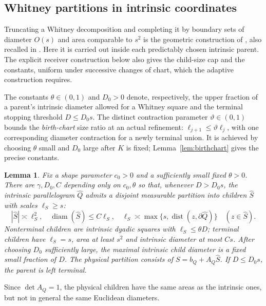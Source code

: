 \documentclass[11pt]{article}
\newtheorem{lemma}[lemma]{Lemma}
\theoremstyle{definition}
\theoremstyle{remark}
\numberwithin{equation}{section}
\newcommand{\dist}{\operatorname{dist}}
\newcommand{\diam}{\operatorname{diam}}
\begin{document}
\subsection{Whitney partitions in intrinsic coordinates}
Truncating a Whitney decomposition and completing it by boundary
sets of diameter $O(s)$ and area comparable to $s^2$ is the
geometric construction of \cite[Lemma~5.1 and Appendix~A]{umc:AGT22},
also recalled in \cite[Section~2.3, Lemma~2.1]{GT-combinatorial}.
Here it is carried out inside each predictably chosen intrinsic
parent. The explicit receiver construction below also gives
the child-size cap and the constants, uniform under successive
changes of chart, which the adaptive construction requires.

\label{not:whitneyparameters}
The constants $\theta\in(0,1)$ and $D_0>0$ denote, respectively,
the upper fraction of a parent's intrinsic diameter allowed for a
Whitney square and the terminal stopping threshold $D\le D_0s$.
The distinct contraction parameter $\vartheta\in(0,1)$ bounds the
\emph{birth-chart} size ratio at an actual refinement:
$\ell_{j+1}\le\vartheta\ell_j$, with one corresponding
diameter contraction for a newly terminal union.  It is achieved by
choosing $\theta$ small and $D_0$ large after $K$ is fixed;
Lemma~\ref{lem:birthchart} gives the precise constants.

\begin{lemma}\label{lem:whitney}
Fix a shape parameter $c_0>0$ and a sufficiently small fixed $\theta>0$.
There are $\gamma,D_0,C$ depending only on $c_0,\theta$ so that, whenever
$D>D_0s$, the \emph{intrinsic} parallelogram $\widehat Q$ admits a disjoint
measurable partition into children $\widehat S$ with scales $\ell_S\ge s$:
\begin{equation}\label{eq:whitney}
 |\widehat S|\asymp \ell_S^2,\quad
 \diam(\widehat S)\le C\ell_S,\quad
 \ell_S\asymp\max\{s,\dist(z,\partial\widehat Q)\}
       \quad(z\in\widehat S).
\end{equation}
Nonterminal children are \emph{intrinsic} dyadic squares with
$\ell_S\le\theta D$; terminal children have $\ell_S=s$, area at least
$s^2$ and intrinsic diameter at most $Cs$.
After choosing $D_0$ sufficiently large, the maximal intrinsic child
diameter is a fixed small fraction of $D$. The physical partition
consists of $S=b_Q+A_Q\widehat S$.
If $D\le D_0s$, the parent is left terminal.
\end{lemma}

Since $\det A_Q=1$, the physical children have the same areas as the
intrinsic ones, but not in general the same Euclidean diameters.
\end{document}
